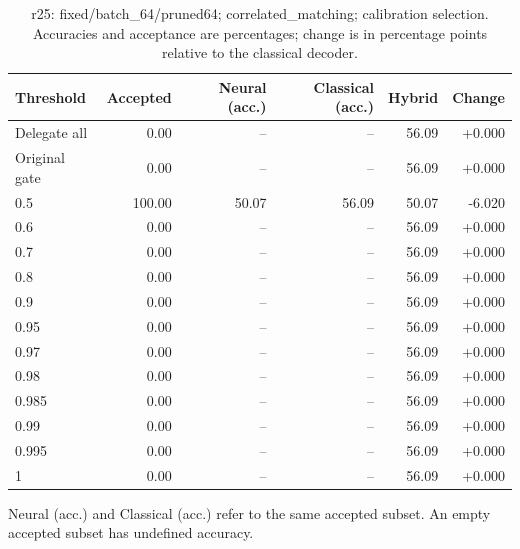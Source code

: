 \begin{table}[htbp]
\centering\small
\setlength{\tabcolsep}{3pt}
\caption{r25: fixed/batch\_64/pruned64; correlated\_matching; calibration selection. Accuracies and acceptance are percentages; change is in percentage points relative to the classical decoder.}
\begin{tabular}{lrrrrr}
\toprule
Threshold & Accepted & Neural (acc.) & Classical (acc.) & Hybrid & Change \\
\midrule
Delegate all & 0.00 & -- & -- & 56.09 & +0.000 \\
Original gate & 0.00 & -- & -- & 56.09 & +0.000 \\
0.5 & 100.00 & 50.07 & 56.09 & 50.07 & -6.020 \\
0.6 & 0.00 & -- & -- & 56.09 & +0.000 \\
0.7 & 0.00 & -- & -- & 56.09 & +0.000 \\
0.8 & 0.00 & -- & -- & 56.09 & +0.000 \\
0.9 & 0.00 & -- & -- & 56.09 & +0.000 \\
0.95 & 0.00 & -- & -- & 56.09 & +0.000 \\
0.97 & 0.00 & -- & -- & 56.09 & +0.000 \\
0.98 & 0.00 & -- & -- & 56.09 & +0.000 \\
0.985 & 0.00 & -- & -- & 56.09 & +0.000 \\
0.99 & 0.00 & -- & -- & 56.09 & +0.000 \\
0.995 & 0.00 & -- & -- & 56.09 & +0.000 \\
1 & 0.00 & -- & -- & 56.09 & +0.000 \\
\bottomrule
\end{tabular}
\par\smallskip\footnotesize Neural (acc.) and Classical (acc.) refer to the same accepted subset. An empty accepted subset has undefined accuracy.
\end{table}
